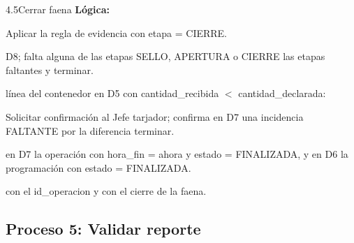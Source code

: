 \begin{minispec}{4.5}{Cerrar faena}
\textbf{Lógica:}
\begin{logica}
    \item Aplicar la regla de evidencia con etapa = CIERRE.
    \item {} D8;  falta alguna de las etapas SELLO, APERTURA o CIERRE  las etapas faltantes y terminar.
    \item {} línea del contenedor en D5 con cantidad\_recibida $<$
    cantidad\_declarada:
    \begin{logica}
        \item Solicitar confirmación al Jefe tarjador;  confirma 
        en D7 una incidencia FALTANTE por la diferencia  terminar.
    \end{logica}
    \item {} en D7 la operación con hora\_fin = ahora y estado = FINALIZADA, y en
    D6 la programación con estado = FINALIZADA.
    \item {}  con el id\_operacion y 
     con el cierre de la faena.
\end{logica}
\end{minispec}

\subsection{Proceso 5: Validar reporte}

